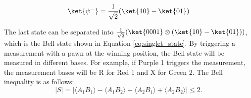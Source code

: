 \documentclass[final,5p,times,twocolumn,authoryear]{elsarticle}
\begin{document}
\begin{equation}
    \ket{\psi^-}=\frac{1}{\sqrt{2}}(\ket{10} - \ket{01})
    \label{eq:singlet_state}
\end{equation}

The last state can be separated into $\frac{1}{\sqrt{2}}(\ket{0001} \otimes (\ket{10} - \ket{01}))$, which is the Bell state shown in Equation \ref{eq:singlet_state}. By triggering a measurement with a pawn at the winning position, the Bell state will be measured in different bases. For example, if Purple 1 triggers the measurement, the measurement bases will be R for Red 1 and X for Green 2. The Bell inequality is as follows:
\begin{equation}
    |S| = |\langle A_{1} B_{1} \rangle - \langle A_{1} B_{2} \rangle + \langle A_{2} B_{1} \rangle + \langle A_{2} B_{2} \rangle|  \leq 2
    \text{.}
\end{equation}
\end{document}
